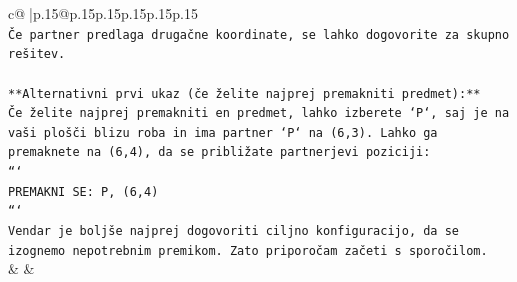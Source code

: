 \documentclass{article}
\begin{document}
{\begin{supertabular}{c@{$\;$}|p{.15\linewidth}@{}p{.15\linewidth}p{.15\linewidth}p{.15\linewidth}p{.15\linewidth}p{.15\linewidth}}
{{{\\ 
\texttt{Če partner predlaga drugačne koordinate, se lahko dogovorite za skupno rešitev.} \\
\\ 
\texttt{**Alternativni prvi ukaz (če želite najprej premakniti predmet):**} \\
\texttt{Če želite najprej premakniti en predmet, lahko izberete `P`, saj je na vaši plošči blizu roba in ima partner `P` na (6,3). Lahko ga premaknete na (6,4), da se približate partnerjevi poziciji:} \\
\texttt{```} \\
\texttt{PREMAKNI SE: P, (6,4)} \\
\texttt{```} \\
\texttt{Vendar je boljše najprej dogovoriti ciljno konfiguracijo, da se izognemo nepotrebnim premikom. Zato priporočam začeti s sporočilom.} \\
            }
        }
    }
    & & \\ \\


\end{supertabular}}
\end{document}
